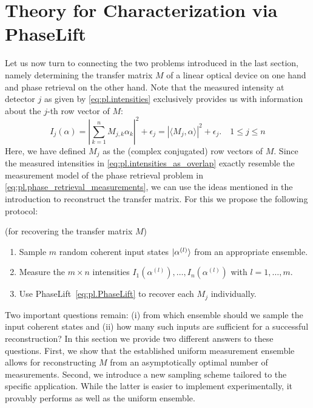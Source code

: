 \section{Theory for Characterization via PhaseLift}

Let us now turn to connecting the two problems introduced in the last section, namely determining the transfer matrix ${M}$ of a linear optical device on one hand and phase retrieval on the other hand.
Note that the measured intensity at detector $j$ as given by \cref{eq:pl.intensities} exclusively provides us with information about the $j$-th row vector of ${M}$:
\[
  I_j({\alpha})
  = \left| \sum_{k=1}^n M_{j,k} \alpha_k \right|^2 + \epsilon_j
  = \left\vert  \langle {M}_j, \alpha \rangle  \right\vert^2 + \epsilon_j. \quad 1 \leq j \leq n
  \label{eq:pl.intensities_as_overlap}
\]
Here, we have defined ${M}_j$ as the (complex conjugated) row vectors of ${M}$.
Since the measured intensities in \cref{eq:pl.intensities_as_overlap} exactly resemble the measurement model of the phase retrieval problem in \cref{eq:pl.phase_retrieval_measurements}, we can use the ideas mentioned in the introduction to reconstruct the transfer matrix.
For this we propose the following protocol:
\begin{protocol}{(for recovering the transfer matrix $ M$)}%
  \label{prot:characterization}
  \begin{enumerate}
    \item Sample $m$ random coherent input states $\ket{ \alpha^{(l)}}$ from an appropriate ensemble.
    \item Measure the $m \times n$ intensities $I_1(\alpha^{(l)}), \ldots, I_n ( \alpha^{(l)})$ with $l=1,\ldots,m$.
    \item Use PhaseLift~\eqref{eq:pl.PhaseLift} to recover each ${M}_j$ individually.
  \end{enumerate}
\end{protocol}
Two important questions remain:
(i) from which ensemble should we sample the input coherent states and (ii) how many such inputs are sufficient for a successful reconstruction?
In this section we provide two different answers to these questions.
First, we show that the established uniform measurement ensemble~\cite{Kueng_2014_Low} allows for reconstructing $ M$ from an asymptotically optimal number of measurements.
Second, we introduce a new sampling scheme tailored to the specific application.
While the latter is easier to implement experimentally, it provably performs as well as the uniform ensemble.

